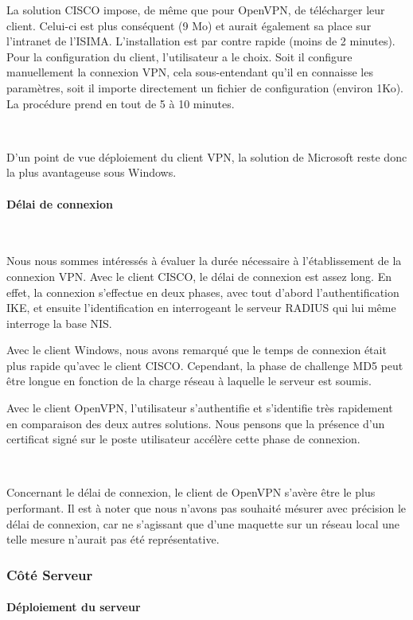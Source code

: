 La solution CISCO impose, de même que pour OpenVPN, de télécharger leur client. Celui-ci est plus conséquent (9 Mo) et aurait également sa place sur l'intranet de l'ISIMA. L'installation est par contre rapide (moins de 2 minutes). Pour la configuration du client, l'utilisateur a le choix. Soit il configure manuellement la connexion VPN, cela sous-entendant qu'il en connaisse les paramètres, soit il importe directement un fichier de configuration (environ 1Ko). La procédure prend en tout de 5 à 10 minutes.

~

D'un point de vue déploiement du client VPN, la solution de Microsoft reste donc la plus avantageuse sous Windows.

\paragraph{Délai de connexion}
~\

Nous nous sommes intéressés à évaluer la durée nécessaire à l'établissement de la connexion VPN. Avec le client CISCO, le délai de connexion est assez long. En effet, la connexion s'effectue en deux phases, avec tout d'abord l'authentification IKE, et ensuite l'identification en interrogeant le serveur RADIUS qui lui même interroge la base NIS.

Avec le client Windows, nous avons remarqué que le temps de connexion était plus rapide qu'avec le client CISCO. Cependant, la phase de challenge MD5 peut être longue en fonction de la charge réseau à laquelle le serveur est soumis.

Avec le client OpenVPN, l'utilisateur s'authentifie et s'identifie très rapidement en comparaison des deux autres solutions. Nous pensons que la présence d'un certificat signé sur le poste utilisateur accélère cette phase de connexion.

~

Concernant le délai de connexion, le client de OpenVPN s'avère être le plus performant. Il est à noter que nous n'avons pas souhaité mésurer avec précision le délai de connexion, car ne s'agissant que d'une maquette sur un réseau local une telle mesure n'aurait pas été représentative.

\subsubsection{Côté Serveur}

\paragraph{Déploiement du serveur}
~

